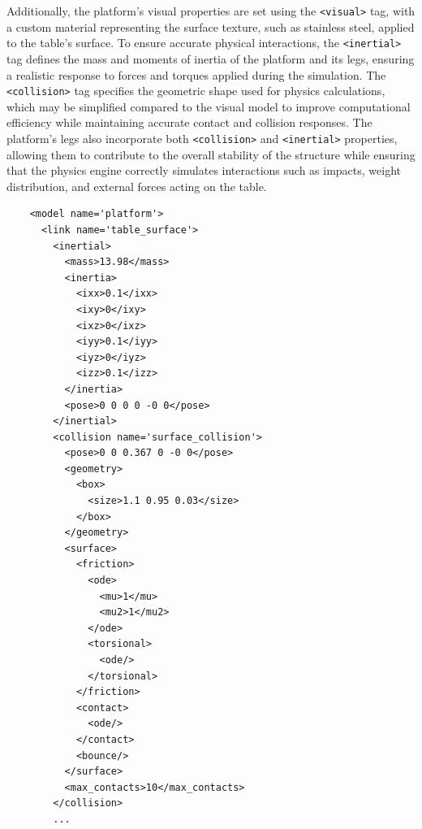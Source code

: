 \documentclass[../../main]{subfiles}
\begin{document}
Additionally, the platform’s visual properties are set using the \texttt{<visual>} tag, 
with a custom material representing the surface texture, such as stainless steel, applied to the table’s surface.  
To ensure accurate physical interactions, the \texttt{<inertial>} tag defines the mass and moments of inertia of the 
platform and its legs, ensuring a realistic response to forces and torques applied during the simulation.  
The \texttt{<collision>} tag specifies the geometric shape used for physics calculations, which may be simplified 
compared to the visual model to improve computational efficiency while maintaining accurate contact and 
collision responses. The platform's legs also incorporate both \texttt{<collision>} and \texttt{<inertial>} properties, 
allowing them to contribute to the overall stability of the structure while ensuring that the physics engine correctly 
simulates interactions such as impacts, weight distribution, and external forces acting on the table.  
\begin{codebox}[]{}
  
  \begin{verbatim}
    <model name='platform'>
      <link name='table_surface'>
        <inertial>
          <mass>13.98</mass>
          <inertia>
            <ixx>0.1</ixx>
            <ixy>0</ixy>
            <ixz>0</ixz>
            <iyy>0.1</iyy>
            <iyz>0</iyz>
            <izz>0.1</izz>
          </inertia>
          <pose>0 0 0 0 -0 0</pose>
        </inertial>
        <collision name='surface_collision'>
          <pose>0 0 0.367 0 -0 0</pose>
          <geometry>
            <box>
              <size>1.1 0.95 0.03</size>
            </box>
          </geometry>
          <surface>
            <friction>
              <ode>
                <mu>1</mu>
                <mu2>1</mu2>
              </ode>
              <torsional>
                <ode/>
              </torsional>
            </friction>
            <contact>
              <ode/>
            </contact>
            <bounce/>
          </surface>
          <max_contacts>10</max_contacts>
        </collision>
        ...
\end{verbatim}
\end{codebox}
\end{document}
